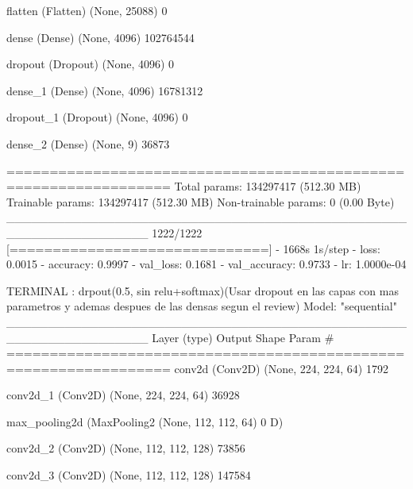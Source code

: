 \documentclass[11pt, a4paper]{article} %
\begin{document}
 flatten (Flatten)           (None, 25088)             0         
                                                                 
 dense (Dense)               (None, 4096)              102764544 
                                                                 
 dropout (Dropout)           (None, 4096)              0         
                                                                 
 dense_1 (Dense)             (None, 4096)              16781312  
                                                                 
 dropout_1 (Dropout)         (None, 4096)              0         
                                                                 
 dense_2 (Dense)             (None, 9)                 36873     
                                                                 
=================================================================
Total params: 134297417 (512.30 MB)
Trainable params: 134297417 (512.30 MB)
Non-trainable params: 0 (0.00 Byte)
_________________________________________________________________
1222/1222 [==============================] - 1668s 1s/step - loss: 0.0015 - accuracy: 0.9997 - val_loss: 0.1681 - val_accuracy: 0.9733 - lr: 1.0000e-04


TERMINAL : drpout(0.5, sin relu+softmax)(Usar dropout en las capas con mas parametros y ademas despues de las densas segun el review)
Model: "sequential"
_________________________________________________________________
 Layer (type)                Output Shape              Param #   
=================================================================
 conv2d (Conv2D)             (None, 224, 224, 64)      1792      
                                                                 
 conv2d_1 (Conv2D)           (None, 224, 224, 64)      36928     
                                                                 
 max_pooling2d (MaxPooling2  (None, 112, 112, 64)      0         
 D)                                                              
                                                                 
 conv2d_2 (Conv2D)           (None, 112, 112, 128)     73856     
                                                                 
 conv2d_3 (Conv2D)           (None, 112, 112, 128)     147584    
                                                                 
\end{document}
